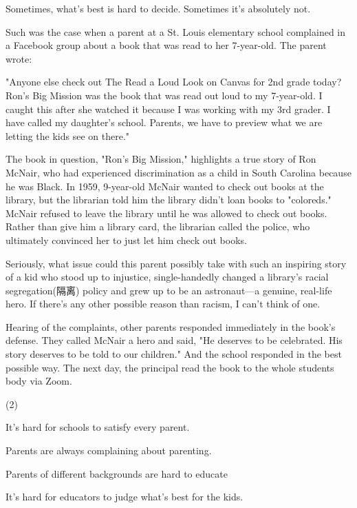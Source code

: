 \documentclass{英语试卷}
\begin{document}
\par Sometimes, what's best is hard to decide. Sometimes it's absolutely not.\par
\par Such was the case when a parent at a St. Louis elementary school complained in a Facebook group about a book that was read to her 7-year-old. The parent wrote:\par
\par "Anyone else check out The Read a Loud Look on Canvas for 2nd grade today? Ron's Big Mission was the book that was read out loud to my 7-year-old. I caught this after she watched it because I was working with my 3rd grader. I have called my daughter's school. Parents, we have to preview what we are letting the kids see on there."\par
\par The book in question, "Ron's Big Mission," highlights a true story of Ron McNair, who had experienced discrimination as a child in South Carolina because he was Black. In 1959, 9-year-old McNair wanted to check out books at the library, but the librarian told him the library didn't loan books to "coloreds." McNair refused to leave the library until he was allowed to check out books. Rather than give him a library card, the librarian called the police, who ultimately convinced her to just let him check out books.\par
\par Seriously, what issue could this parent possibly take with such an inspiring story of a kid who stood up to injustice, single-handedly changed a library's racial segregation(隔离) policy and grew up to be an astronaut—a genuine, real-life hero. If there's any other possible reason than racism, I can't think of one.\par
\par Hearing of the complaints, other parents responded immediately in the book's defense. They called McNair a hero and said, "He deserves to be celebrated. His story deserves to be told to our children." And the school responded in the best possible way. The next day, the principal read the book to the whole students body via Zoom.\par
{}
\begin{choices}(2)
  \item It's hard for schools to satisfy every parent.
  \item Parents are always complaining about parenting.
  \item Parents of different backgrounds are hard to educate
  \item It's hard for educators to judge what's best for the kids.
\end{choices}
\end{document}
